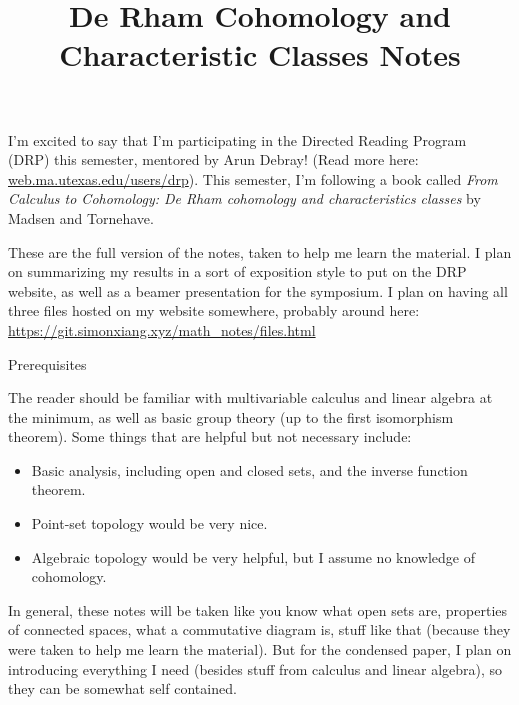 \documentclass[fontsize=9pt]{article}
\title{De Rham Cohomology and Characteristic Classes Notes}
\begin{document}
\maketitle
I'm excited to say that I'm participating in the Directed Reading Program (DRP) this semester, mentored by Arun Debray! (Read more here: \url{web.ma.utexas.edu/users/drp}). This semester, I'm following a book called \emph{From Calculus to Cohomology: De Rham cohomology and characteristics classes} by Madsen and Tornehave. 

These are the full version of the notes, taken to help me learn the material. I plan on summarizing my results in a sort of exposition style to put on the DRP website, as well as a beamer presentation for the symposium. I plan on having all three files hosted on my website somewhere, probably around here: \url{https://git.simonxiang.xyz/math_notes/files.html}

\begin{center}
    \large\sc Prerequisites
\end{center}
The reader should be familiar with multivariable calculus and linear algebra at the minimum, as well as basic group theory (up to the first isomorphism theorem). Some things that are helpful but not necessary include:
\begin{itemize}
    \setlength\itemsep{-0.2em}
    \item Basic analysis, including open and closed sets, and the inverse function theorem.
    \item Point-set topology would be very nice.
    \item Algebraic topology would be very helpful, but I assume no knowledge of cohomology. 
\end{itemize}
In general, these notes will be taken like you know what open sets are, properties of connected spaces, what a commutative diagram is, stuff like that (because they were taken to help me learn the material). But for the condensed paper, I plan on introducing everything I need (besides stuff from calculus and linear algebra), so they can be somewhat self contained.
\tableofcontents
    
    
\end{document}
